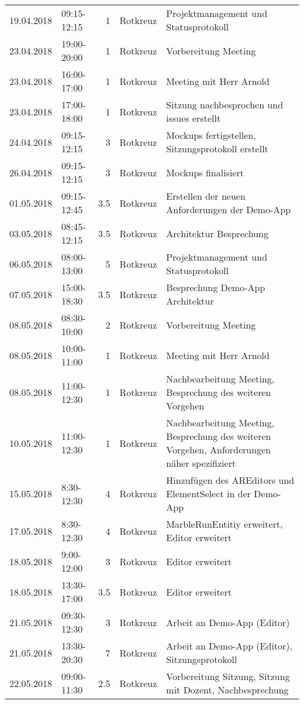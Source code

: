 \begin{longtable}{llrlp{7cm}}
	19.04.2018 & 09:15-12:15 & 1      & Rotkreuz & Projektmanagement und Statusprotokoll \\
	23.04.2018 & 19:00-20:00 & 1      & Rotkreuz & Vorbereitung Meeting \\
	23.04.2018 & 16:00-17:00 & 1      & Rotkreuz & Meeting mit Herr Arnold \\
	23.04.2018 & 17:00-18:00 & 1      & Rotkreuz & Sitzung nachbesprochen und issues erstellt \\
	24.04.2018 & 09:15-12:15 & 3      & Rotkreuz & Mockups fertigstellen, Sitzungsprotokoll erstellt \\
	26.04.2018 & 09:15-12:15 & 3      & Rotkreuz & Mockups finalisiert \\
	01.05.2018 & 09:15-12:45 & 3.5      & Rotkreuz & Erstellen der neuen Anforderungen der Demo-App \\
	03.05.2018 & 08:45-12:15 & 3.5      & Rotkreuz & Architektur Besprechung \\
	06.05.2018 & 08:00-13:00 & 5      & Rotkreuz & Projektmanagement und Statusprotokoll \\
	07.05.2018 & 15:00-18:30 & 3.5      & Rotkreuz & Besprechung Demo-App Architektur  \\
	08.05.2018 & 08:30-10:00 & 2      & Rotkreuz & Vorbereitung Meeting  \\
	08.05.2018 & 10:00-11:00 & 1      & Rotkreuz & Meeting mit Herr Arnold  \\
	08.05.2018 & 11:00-12:30 & 1      & Rotkreuz & Nachbearbeitung Meeting, Besprechung des weiteren Vorgehen  \\
	10.05.2018 & 11:00-12:30 & 1      & Rotkreuz & Nachbearbeitung Meeting, Besprechung des weiteren Vorgehen, Anforderungen näher spezifiziert  \\
	15.05.2018 & 8:30-12:30 & 4      & Rotkreuz & Hinzufügen des AREditors und ElementSelect in der Demo-App  \\
	17.05.2018 & 8:30-12:30 & 4      & Rotkreuz & MarbleRunEntitiy erweitert, Editor erweitert  \\
	18.05.2018 & 9:00-12:00 & 3      & Rotkreuz & Editor erweitert  \\
	18.05.2018 & 13:30-17:00 & 3.5      & Rotkreuz & Editor erweitert  \\
	21.05.2018 & 09:30-12:30 & 3      & Rotkreuz & Arbeit an Demo-App (Editor)  \\
	21.05.2018 & 13:30-20:30 & 7      & Rotkreuz & Arbeit an Demo-App (Editor), Sitzungsprotokoll  \\
	22.05.2018 & 09:00-11:30 & 2.5    & Rotkreuz & Vorbereitung Sitzung, Sitzung mit Dozent, Nachbesprechung \\

\end{longtable}
